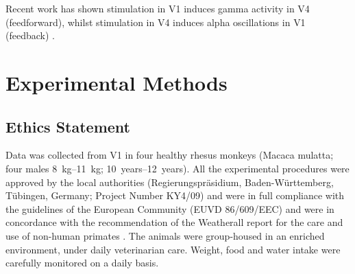 Recent work has shown stimulation in \ac{V1} induces gamma activity in \ac{V4} (feedforward), whilst stimulation in \ac{V4} induces alpha oscillations in \ac{V1} (feedback) \citep{VanKerkoerle2014}.
\section{Experimental Methods}
\subsection{Ethics Statement}
Data was collected from \ac{V1} in four healthy rhesus monkeys (Macaca mulatta; four males \SIrange{8}{11}{kg}; \SIrange{10}{12}{years}).
All the experimental procedures were approved by the local authorities (Regierungspr\"asidium, Baden-W\"urttemberg, T\"ubingen, Germany; Project Number KY4/09) and were in full compliance with the guidelines of the European Community (EUVD 86/609/EEC) and were in concordance with the recommendation of the Weatherall report for the care and use of non-human primates \citep{Weatherall2006}.
The animals were group-housed in an enriched environment, under daily veterinarian care.
Weight, food and water intake were carefully monitored on a daily basis.

